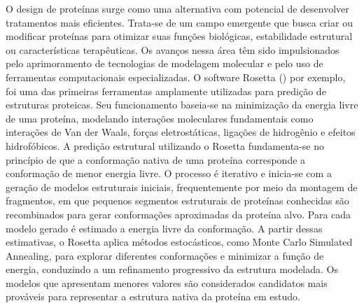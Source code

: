O design de proteínas surge como uma alternativa com potencial de desenvolver tratamentos mais eficientes. 
Trata-se de um campo emergente que busca criar ou modificar proteínas para otimizar suas funções biológicas, 
estabilidade estrutural ou características terapêuticas. 
Os avanços nessa área têm sido impulsionados pelo aprimoramento de tecnologias de modelagem molecular
e pelo uso de ferramentas computacionais especializadas.
O software Rosetta (\cite{Rosetta}) por exemplo,
foi uma das primeiras ferramentas amplamente utilizadas para predição de estruturas proteicas.
Seu funcionamento baseia-se na minimização da energia livre de uma proteína, 
modelando interações moleculares fundamentais como interações de Van der Waals,
forças eletrostáticas, ligações de hidrogênio e efeitos hidrofóbicos.
A predição estrutural utilizando o Rosetta fundamenta-se no princípio de que a conformação nativa de uma proteína 
corresponde a conformação de menor energia livre. 
O processo é iterativo e inicia-se com a geração de modelos estruturais iniciais, 
frequentemente por meio da montagem de fragmentos, 
em que pequenos segmentos estruturais de proteínas conhecidas são recombinados para gerar conformações aproximadas da proteína alvo.
Para cada modelo gerado é estimado a energia livre da conformação.
A partir dessas estimativas, o Rosetta aplica métodos estocásticos, 
como Monte Carlo Simulated Annealing, para explorar diferentes conformações e minimizar a função de energia,
conduzindo a um refinamento progressivo da estrutura modelada. 
Os modelos que apresentam menores valores são considerados candidatos mais prováveis para representar a estrutura nativa
da proteína em estudo.


